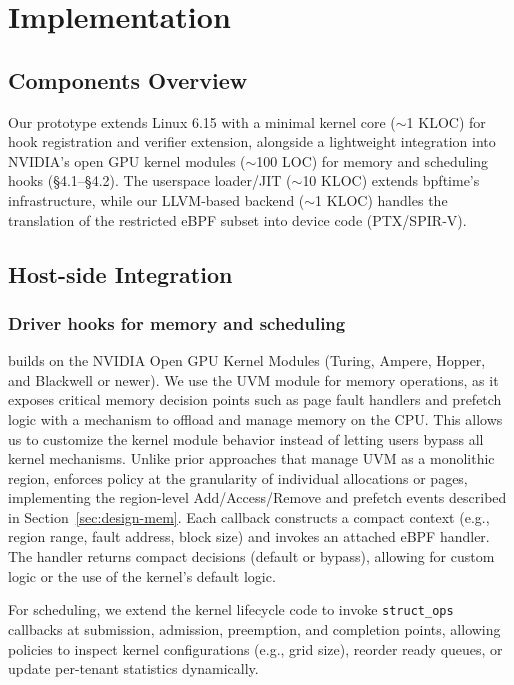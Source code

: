 
\section{Implementation}
\label{sec:implementation}

\subsection{Components Overview}

Our prototype extends Linux 6.15 with a minimal kernel core ($\sim$1 KLOC) for hook registration and verifier extension, alongside a lightweight integration into NVIDIA's open GPU kernel modules ($\sim$100 LOC) for memory and scheduling hooks (§4.1–§4.2). The userspace loader/JIT ($\sim$10 KLOC) extends bpftime's infrastructure, while our LLVM-based backend ($\sim$1 KLOC) handles the translation of the restricted \sys eBPF subset into device code (PTX/SPIR‑V).

\subsection{Host-side Integration}
\label{sec:impl-host}

\subsubsection{Driver hooks for memory and scheduling}

\sys builds on the NVIDIA Open GPU Kernel Modules (Turing, Ampere, Hopper, and Blackwell or newer). We use the UVM module for memory operations, as it exposes critical memory decision points such as page fault handlers and prefetch logic with a mechanism to offload and manage memory on the CPU. This allows us to customize the kernel module behavior instead of letting users bypass all kernel mechanisms. Unlike prior approaches that manage UVM as a monolithic region, \sys enforces policy at the granularity of individual allocations or pages, implementing the region-level Add/Access/Remove and prefetch events described in Section~\ref{sec:design-mem}. Each callback constructs a compact context (e.g., region range, fault address, block size) and invokes an attached eBPF handler. The handler 
returns compact decisions (default or bypass), allowing for custom logic or the use of the kernel's default logic.

For scheduling, we extend the kernel lifecycle code to invoke \texttt{struct\_ops} callbacks at submission, admission, preemption, and completion points, allowing policies to inspect kernel configurations (e.g., grid size), reorder ready queues, or update per-tenant statistics dynamically.

